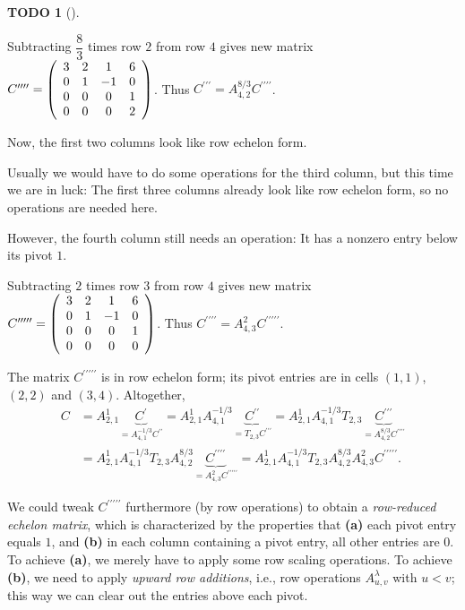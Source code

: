 \documentclass[numbers=enddot,12pt,final,onecolumn,notitlepage]{scrartcl}%
\theoremstyle{definition}
\newtheorem{quest}[theo]{TODO}
\newenvironment{todo}[1][]
{\begin{quest}[#1]\begin{leftbar}}
{\end{leftbar}\end{quest}}
\begin{document}
\begin{todo}
Subtracting $\dfrac{8}{3}$ times row $2$ from row $4$ gives new matrix
$C^{\prime\prime\prime\prime}=\left(
\begin{array}
[c]{cccc}%
3 & 2 & 1 & 6\\
0 & 1 & -1 & 0\\
0 & 0 & 0 & 1\\
0 & 0 & 0 & 2
\end{array}
\right)  $. Thus $C^{\prime\prime\prime}=A_{4,2}^{8/3}C^{\prime\prime
\prime\prime}$.

Now, the first two columns look like row echelon form.

Usually we would have to do some operations for the third column, but this
time we are in luck: The first three columns already look like row echelon
form, so no operations are needed here.

However, the fourth column still needs an operation: It has a nonzero entry
below its pivot $1$.

Subtracting $2$ times row $3$ from row $4$ gives new matrix $C^{\prime
\prime\prime\prime\prime}=\left(
\begin{array}
[c]{cccc}%
3 & 2 & 1 & 6\\
0 & 1 & -1 & 0\\
0 & 0 & 0 & 1\\
0 & 0 & 0 & 0
\end{array}
\right)  $. Thus $C^{\prime\prime\prime\prime}=A_{4,3}^{2}C^{\prime
\prime\prime\prime\prime}$.

The matrix $C^{\prime\prime\prime\prime\prime}$ is in row echelon form; its
pivot entries are in cells $\left(  1,1\right)  $, $\left(  2,2\right)  $ and
$\left(  3,4\right)  $. Altogether,%
\begin{align*}
C  &  =A_{2,1}^{1}\underbrace{C^{\prime}}_{=A_{4,1}^{-1/3}C^{\prime\prime}%
}=A_{2,1}^{1}A_{4,1}^{-1/3}\underbrace{C^{\prime\prime}}_{=T_{2,3}%
C^{\prime\prime\prime}}=A_{2,1}^{1}A_{4,1}^{-1/3}T_{2,3}\underbrace{C^{\prime
\prime\prime}}_{=A_{4,2}^{8/3}C^{\prime\prime\prime\prime}}\\
&  =A_{2,1}^{1}A_{4,1}^{-1/3}T_{2,3}A_{4,2}^{8/3}\underbrace{C^{\prime
\prime\prime\prime}}_{=A_{4,3}^{2}C^{\prime\prime\prime\prime\prime}}%
=A_{2,1}^{1}A_{4,1}^{-1/3}T_{2,3}A_{4,2}^{8/3}A_{4,3}^{2}C^{\prime\prime
\prime\prime\prime}.
\end{align*}


We could tweak $C^{\prime\prime\prime\prime\prime}$ furthermore (by row
operations) to obtain a \textit{row-reduced echelon matrix}, which is
characterized by the properties that \textbf{(a)} each pivot entry equals $1$,
and \textbf{(b)} in each column containing a pivot entry, all other entries
are $0$. To achieve \textbf{(a)}, we merely have to apply some row scaling
operations. To achieve \textbf{(b)}, we need to apply \textit{upward row
additions}, i.e., row operations $A_{u,v}^{\lambda}$ with $u<v$; this way we
can clear out the entries above each pivot.


\end{todo}
\end{document}
